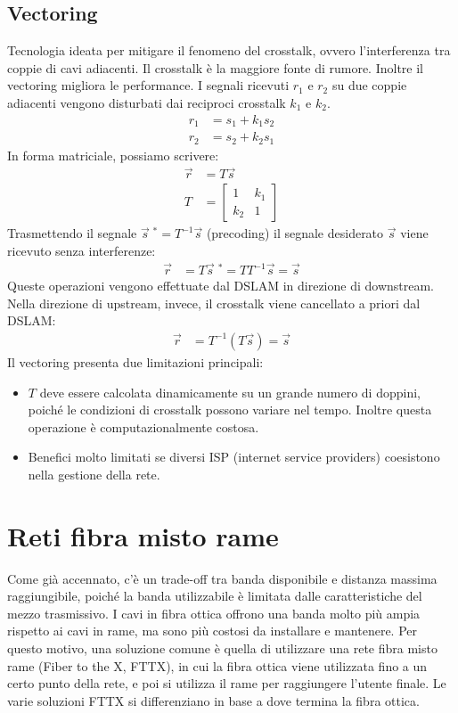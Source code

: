 \subsection{Vectoring}
Tecnologia ideata per mitigare il fenomeno del crosstalk, ovvero l'interferenza tra coppie di cavi adiacenti.
Il crosstalk è la maggiore fonte di rumore. Inoltre il vectoring migliora le performance.
I segnali ricevuti $r_1$ e $r_2$ su due coppie adiacenti vengono disturbati dai reciproci crosstalk $k_1$ e $k_2$.
\begin{align*}
	r_1 &= s_1 + k_1 s_2 \\
	r_2 &= s_2 + k_2 s_1
\end{align*}
In forma matriciale, possiamo scrivere:
\begin{align*}
	\vec{r} &= T \vec{s}\\
	T&=\begin{bmatrix}1 & k_1 \\ k_2 & 1 \end{bmatrix}
\end{align*}
Trasmettendo il segnale $\vec{s}\phantom{.} ^*= T^{-1} \vec{s}$ (precoding) il segnale desiderato $\vec{s}$ viene ricevuto senza interferenze:
\begin{align*}
	\vec{r} &= T \vec{s}\phantom{.} ^* = T T^{-1} \vec{s} = \vec{s}
\end{align*}
Queste operazioni vengono effettuate dal DSLAM in direzione di downstream.
Nella direzione di upstream, invece, il crosstalk viene cancellato a priori dal DSLAM:
\begin{align*}
	\vec{r} &= T^{-1} (T\vec{s})=\vec{s}
\end{align*}
Il vectoring presenta due limitazioni principali:
\begin{itemize}
	\item $T$ deve essere calcolata dinamicamente su un grande numero di doppini, poiché le condizioni di crosstalk possono variare nel tempo. Inoltre questa operazione è computazionalmente costosa.
	\item Benefici molto limitati se diversi ISP (internet service providers) coesistono nella gestione della rete.
\end{itemize}
\section{Reti fibra misto rame}
Come già accennato, c'è un trade-off tra banda disponibile e distanza massima raggiungibile, poiché la banda utilizzabile è limitata dalle caratteristiche del mezzo trasmissivo.
I cavi in fibra ottica offrono una banda molto più ampia rispetto ai cavi in rame, ma sono più costosi da installare e mantenere.
Per questo motivo, una soluzione comune è quella di utilizzare una rete fibra misto rame (Fiber to the X, FTTX), in cui la fibra ottica viene utilizzata fino a un certo punto della rete, e poi si utilizza il rame per raggiungere l'utente finale.
Le varie soluzioni FTTX si differenziano in base a dove termina la fibra ottica.
